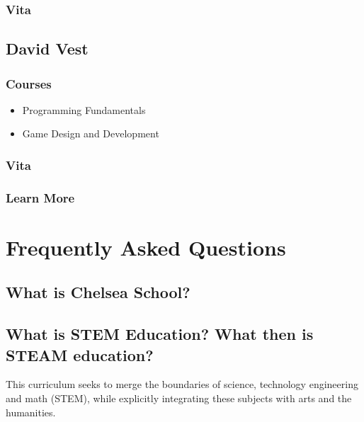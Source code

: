 \documentclass[letterpaper,10pt,english]{sphinxmanual}
\begin{document}
\subsection{Vita}
\label{faculty:id1}

\section{David Vest}
\label{faculty:david-vest}

\subsection{Courses}
\label{faculty:courses}\begin{itemize}
\item {} 
Programming Fundamentals

\item {} 
Game Design and Development

\end{itemize}


\subsection{Vita}
\label{faculty:id2}

\subsection{Learn More}
\label{faculty:id3}

\chapter{Frequently Asked Questions}
\label{faq::doc}\label{faq:index-0}\label{faq:frequently-asked-questions}

\section{What is Chelsea School?}
\label{faq:what-is-chelsea-school}

\section{What is STEM Education? What then is STEAM education?}
\label{faq:what-is-stem-education-what-then-is-steam-education}
This curriculum seeks to merge the boundaries of science, technology engineering and math (STEM), while explicitly integrating these subjects with arts and the humanities.
\end{document}
